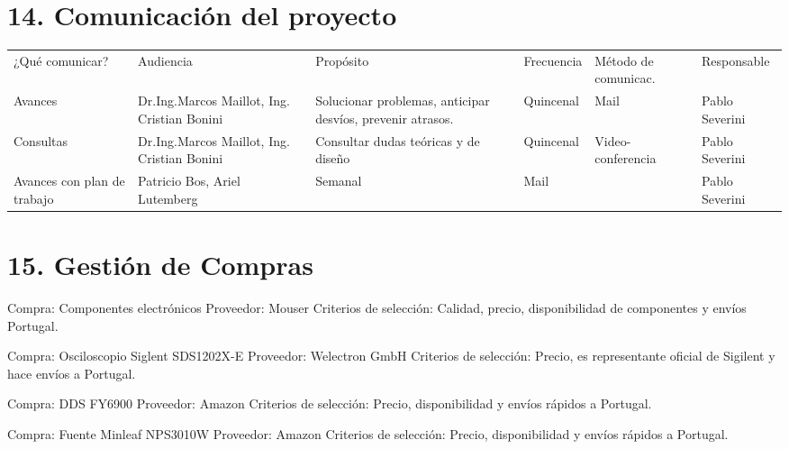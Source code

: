 \documentclass[11pt]{charter}
\begin{document}
\section{14. Comunicación del proyecto}
\label{sec:comunicaciones}

\begin{table}[H]
\centering
\begin{tabularx}{\linewidth}{@{}|X|X|X|X|X|X|@{}}
\hline
\rowcolor[HTML]{C0C0C0} 
\multicolumn{6}{|c|}{\cellcolor[HTML]{C0C0C0}PLAN DE COMUNICACIÓN DEL PROYECTO}           \\ \hline
\rowcolor[HTML]{C0C0C0} 
¿Qué comunicar? & Audiencia & Propósito & Frecuencia & Método de comunicac. & Responsable \\ \hline
Avances         & Dr.Ing.Marcos Maillot, Ing. Cristian Bonini & Solucionar problemas, anticipar desvíos, prevenir atrasos.          & Quincenal  & Mail			        & Pablo Severini            \\ \hline
Consultas       & Dr.Ing.Marcos Maillot, Ing. Cristian Bonini & Consultar dudas teóricas y de diseño  
& Quincenal  	& Video-conferencia     & Pablo Severini            \\ \hline
Avances con plan de trabajo         & Patricio Bos, Ariel Lutemberg  &      Semanal     &  Mail          &                      & Pablo Severini            \\ \hline
\end{tabularx}
\end{table}

\section{15. Gestión de Compras}
\label{sec:compras}
Compra: Componentes electrónicos
Proveedor: Mouser
Criterios de selección: Calidad, precio, disponibilidad de componentes y envíos Portugal.

Compra: Osciloscopio Siglent SDS1202X-E
Proveedor: Welectron GmbH
Criterios de selección: Precio, es representante oficial de Sigilent y hace envíos a Portugal.

Compra: DDS FY6900
Proveedor: Amazon
Criterios de selección: Precio, disponibilidad y envíos rápidos a Portugal.

Compra: Fuente Minleaf NPS3010W
Proveedor: Amazon
Criterios de selección: Precio, disponibilidad y envíos rápidos a Portugal.
\end{document}
